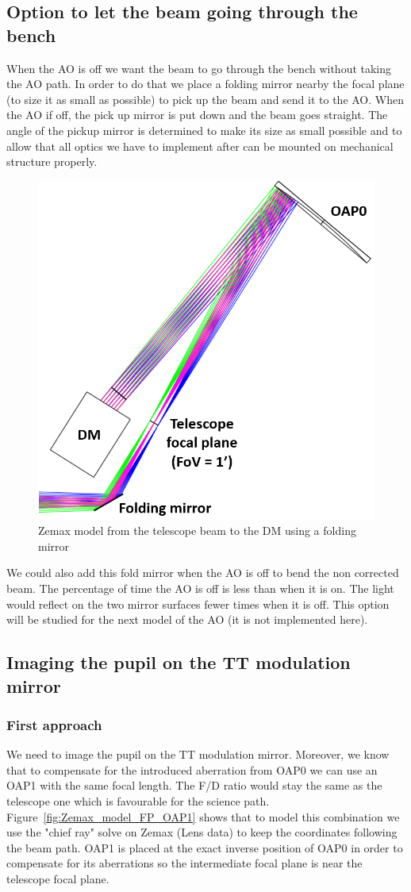\documentclass[12pt,a4paper]{article}
\begin{document}
\subsection{Option to let the beam going through the bench}
When the AO is off we want the beam to go through the bench without taking the AO path. In order to do that we place a folding mirror nearby the focal plane (to size it as small as possible) to pick up the beam and send it to the AO. When the AO if off, the pick up mirror is put down and the beam goes straight. The angle of the pickup mirror is determined to make its size as small possible and to allow that all optics we have to implement after can be mounted on mechanical structure properly.
\begin{figure}[H]
	\begin{center}
		\includegraphics[width=.4\textwidth]{images/FP_DM.PNG}
		\caption{Zemax model from the telescope beam to the DM using a folding mirror}\label{fig:FP_DM}
	\end{center}
\end{figure}
We could also add this fold mirror when the AO is off to bend the non corrected beam. The percentage of time the AO is off is less than when it is on. The light would reflect on the two mirror surfaces fewer times when it is off. This option will be studied for the next model of the AO (it is not implemented here).

\subsection{Imaging the pupil on the TT modulation mirror}

\subsubsection{First approach}
We need to image the pupil on the TT modulation mirror. Moreover, we know that to compensate for the introduced aberration from OAP0 we can use an OAP1 with the same focal length. The F/D ratio would stay the same as the telescope one which is favourable for the science path.\\
Figure~\ref{fig:Zemax_model_FP_OAP1} shows that to model this combination we use the "chief ray" solve on Zemax (Lens data) to keep the coordinates following the beam path. OAP1 is placed at the exact inverse position of OAP0 in order to compensate for its aberrations so the intermediate focal plane is near the telescope focal plane.\\
\end{document}

